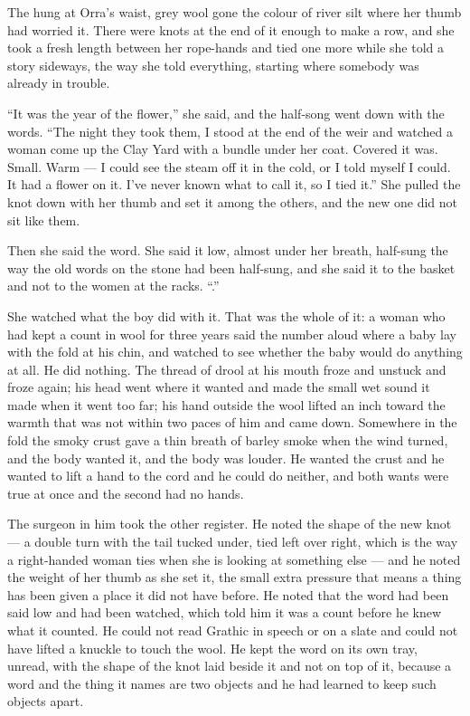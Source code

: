 \scenebreak

The  hung at Orra's waist, grey wool gone the colour of river silt where her thumb had worried it. There were knots at the end of it enough to make a row, and she took a fresh length between her rope-hands and tied one more while she told a story sideways, the way she told everything, starting where somebody was already in trouble.

“It was the year of the flower,” she said, and the half-song went down with the words. “The night they took them, I stood at the end of the weir and watched a woman come up the Clay Yard with a bundle under her coat. Covered it was. Small. Warm --- I could see the steam off it in the cold, or I told myself I could. It had a flower on it. I've never known what to call it, so I tied it.” She pulled the knot down with her thumb and set it among the others, and the new one did not sit like them.

Then she said the word. She said it low, almost under her breath, half-sung the way the old words on the stone had been half-sung, and she said it to the basket and not to the women at the racks. “.”

She watched what the boy did with it. That was the whole of it: a woman who had kept a count in wool for three years said the number aloud where a baby lay with the fold at his chin, and watched to see whether the baby would do anything at all. He did nothing. The thread of drool at his mouth froze and unstuck and froze again; his head went where it wanted and made the small wet sound it made when it went too far; his hand outside the wool lifted an inch toward the warmth that was not within two paces of him and came down. Somewhere in the fold the smoky crust gave a thin breath of barley smoke when the wind turned, and the body wanted it, and the body was louder. He wanted the crust and he wanted to lift a hand to the cord and he could do neither, and both wants were true at once and the second had no hands.

The surgeon in him took the other register. He noted the shape of the new knot --- a double turn with the tail tucked under, tied left over right, which is the way a right-handed woman ties when she is looking at something else --- and he noted the weight of her thumb as she set it, the small extra pressure that means a thing has been given a place it did not have before. He noted that the word had been said low and had been watched, which told him it was a count before he knew what it counted. He could not read Grathic in speech or on a slate and could not have lifted a knuckle to touch the wool. He kept the word on its own tray, unread, with the shape of the knot laid beside it and not on top of it, because a word and the thing it names are two objects and he had learned to keep such objects apart.

